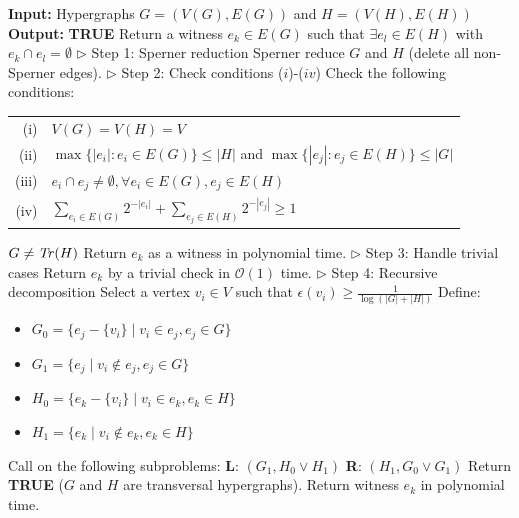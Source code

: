 \begin{algorithm}[p]
\caption{Algorithm \FKA{} for \TransHyp{} (cf. \cite{FK96})}\label{alg:fka}
\begin{algorithmic}[1]
\State \textbf{Input:} Hypergraphs $G=(V(G),E(G))$ and $H=(V(H),E(H))$
\State \textbf{Output:}
\State \textbf{TRUE}
\Else
\State Return a witness $e_k\in E(G)$ such that $\exists e_l\in E(H)$ with $e_k\cap e_l=\emptyset$
\EndIf
\Statex \hfill$\triangleright$ Step 1: Sperner reduction
\State Sperner reduce $G$ and $H$ (delete all non-Sperner edges).
\Statex \hfill$\triangleright$ Step 2: Check conditions ($i$)-($iv$)
\State Check the following conditions:
\Statex \hspace{\algorithmicindent}\begin{tabular}{rl}
(i) & $V(G)=V(H)=V$\\
(ii) & $\max\{|e_i|:e_i\in E(G)\}\leq|H|$ and $\max\{|e_j|:e_j\in E(H)\}\leq|G|$\\
(iii) & $e_i\cap e_j\neq\emptyset,\forall e_i\in E(G),e_j\in E(H)$\\
(iv) & $\sum_{e_i\in E(G)}2^{-|e_i|}+\sum_{e_j\in E(H)}2^{-|e_j|}\geq 1$
\end{tabular}
\State $G\neq\mathit{Tr}(H)$
\State Return $e_k$ as a witness in polynomial time.
\EndIf
\Statex \hfill$\triangleright$ Step 3: Handle trivial cases
\State Return $e_k$ by a trivial check in $\mathcal{O}(1)$ time.
\EndIf
\Statex \hfill$\triangleright$ Step 4: Recursive decomposition
\State Select a vertex $v_i\in V$ such that $\epsilon(v_i)\geq\frac{1}{\log(|G|+|H|)}$
\State Define:
\Statex \hspace{\algorithmicindent}\begin{minipage}{0.8\linewidth}
\begin{itemize}
\item $G_0=\{e_j-\{v_i\}\mid v_i\in e_j,e_j\in G\}$
\item $G_1=\{e_j\mid v_i\notin e_j,e_j\in G\}$
\item $H_0=\{e_k-\{v_i\}\mid v_i\in e_k,e_k\in H\}$
\item $H_1=\{e_k\mid v_i\notin e_k,e_k\in H\}$
\end{itemize}
\end{minipage}
\State Call \FKA{} on the following subproblems:
\State \textbf{L}: $(G_1,H_0\vee H_1)$
\State \textbf{R}: $(H_1,G_0\vee G_1)$
\State Return \textbf{TRUE} ($G$ and $H$ are transversal hypergraphs).
\Else
\State Return witness $e_k$ in polynomial time.
\EndIf
\EndIf
\end{algorithmic}
\end{algorithm}

